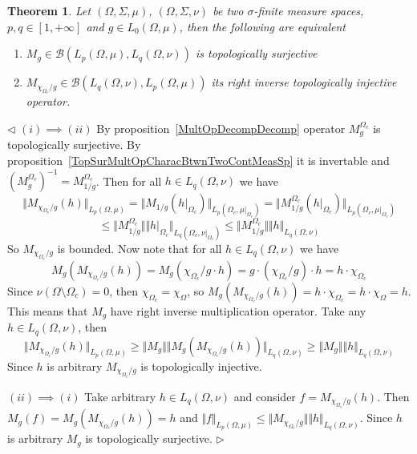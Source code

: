 \documentclass[12pt]{article}
\newtheorem{theorem}{Theorem}[subsection]
\newenvironment{proof}{\par $\triangleleft$}{$\triangleright$}
\begin{document}
\begin{theorem}\label{TopSurMultOpDescBtwnTwoMeasSp}
    Let $(\Omega,\Sigma,\mu)$, $(\Omega,\Sigma,\nu)$ be two $\sigma$-finite
    measure spaces, $p,q\in[1,+\infty]$ and $g\in L_0(\Omega,\mu)$, then the
    following are equivalent
    \begin{enumerate}[label = (\roman*)]
        \item $M_g\in\mathcal{B}(L_p(\Omega,\mu),L_q(\Omega,\nu))$ is
              topologically surjective

        \item $M_{\chi_{\Omega_c}/g}
                  \in\mathcal{B}(L_q(\Omega,\nu), L_p(\Omega,\mu))$ its right inverse
              topologically injective operator.
    \end{enumerate}
\end{theorem}
\begin{proof}
    $(i)\implies (ii)$ By proposition~\ref{MultOpDecompDecomp} operator
    $M_g^{\Omega_c}$ is topologically surjective. By
    proposition~\ref{TopSurMultOpCharacBtwnTwoContMeasSp} it is invertable
    and ${(M_g^{\Omega_c})}^{-1}=M_{1/g}^{\Omega_c}$. Then for
    all $h\in L_q(\Omega,\nu)$ we have
    $$
        \Vert M_{\chi_{\Omega_c}/g}(h)\Vert_{L_p(\Omega,\mu)}= \Vert
        M_{1/g}(h|_{\Omega_c})\Vert_{L_p(\Omega_c,\mu|_{\Omega_c})}= \Vert
        M_{1/g}^{\Omega_c}(h|_{\Omega_c})\Vert_{L_p(\Omega_c,\mu|_{\Omega_c})}
    $$
    $$
        \leq\Vert M_{1/g}^{\Omega_c}\Vert\Vert
        h|_{\Omega_c}\Vert_{L_q(\Omega_c,\nu|_{\Omega_c})} \leq\Vert
        M_{1/g}^{\Omega_c}\Vert\Vert h\Vert_{L_q(\Omega,\nu)}
    $$
    So $M_{\chi_{\Omega_c}/g}$ is bounded. Now note that for
    all $h\in L_q(\Omega,\nu)$ we have
    $$
        M_g(M_{\chi_{\Omega_c}/g}(h)) =M_g(\chi_{\Omega_c}/g\cdot h)
        =g\cdot(\chi_{\Omega_c}/g)\cdot  h =h\cdot\chi_{\Omega_c}
    $$
    Since $\nu(\Omega\setminus\Omega_c)=0$, then
    $\chi_{\Omega_c}=\chi_{\Omega}$, so
    $M_g(M_{\chi_{\Omega_c}/g}(h))=h\cdot\chi_{\Omega_c}=h\cdot\chi_{\Omega}=h$.
    This means that $M_g$ have right inverse multiplication operator.
    Take any $h\in L_q(\Omega,\nu)$, then
    $$
        \Vert M_{\chi_{\Omega_c}/g}(h)\Vert_{L_p(\Omega,\mu)} \geq\Vert
        M_g\Vert\Vert M_g(M_{\chi_{\Omega_c}/g}(h))\Vert_{L_q(\Omega,\nu)}
        \geq\Vert M_g\Vert\Vert h\Vert_{L_q(\Omega,\nu)}
    $$
    Since $h$ is arbitrary $M_{\chi_{\Omega_c}/g}$ is topologically injective.

    $(ii)\implies (i)$ Take arbitrary $h\in L_q(\Omega,\nu)$ and consider
    $f=M_{\chi_{\Omega_c}/g}(h)$. Then $M_g(f)=M_g(M_{\chi_{\Omega_c}/g}(h))=h$
    and $\Vert f\Vert_{L_p(\Omega,\mu)}
        \leq\Vert M_{\chi_{\Omega_c}/g}\Vert\Vert h\Vert_{L_q(\Omega,\nu)}$. Since
    $h$ is arbitrary $M_g$ is topologically surjective.
\end{proof}
\end{document}
